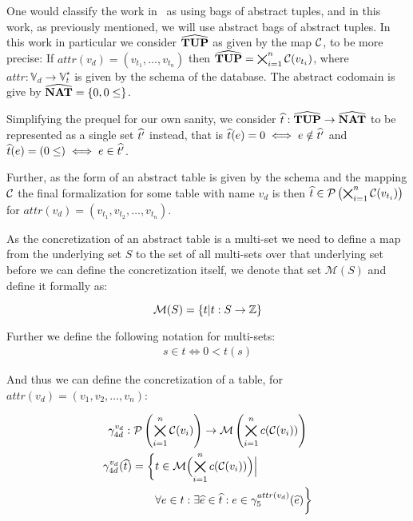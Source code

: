 One would classify the work in~\cite{halder_abstract_2012} as using bags of abstract tuples, and in this work, as previously mentioned, we will use abstract bags of abstract tuples.
In this work in particular we consider $\widehat{\mathbf{TUP}}$ as given by the map $\mathcal{C}$, to be more precise:
If $attr(v_d) = (v_{t_1}, \dots, v_{t_n})$ then $\widehat{\mathbf{TUP}} = \bigtimes_{i = 1}^n \mathcal{C}(v_{t_i})$, where $attr : \mathbb{V}_d \rightarrow \mathbb{V}_t^\star$ is given by the schema of the database.
The abstract codomain is give by $\widehat{\mathbf{NAT}} = \{0, 0 \leq\}$.

Simplifying the prequel for our own sanity, we consider $\widehat{t} : \widehat{\mathbf{TUP}} \rightarrow \widehat{\mathbf{NAT}}$ to be represented as a single set $\widehat{t'}$ instead, that is $\widehat{t}({e}) = 0 \iff e \notin \widehat{t'}$ and  $\widehat{t}({e}) = (0 \leq) \iff e \in \widehat{t'}$.

Further, as the form of an abstract table is given by the schema and the mapping $\mathcal{C}$ the final formalization for some table with name $v_d$ is then $\widehat{t} \in \mathcal{P}\left(\bigtimes_{i = 1}^{n}\mathcal{C}(v_{t_i})\right)$ for $attr(v_d) = (v_{t_1}, v_{t_2}, \dots, v_{t_n})$.

As the concretization of an abstract table is a multi-set we need to define a map from the underlying set $S$ to the set of all multi-sets over that underlying set before we can define the concretization itself, we denote that set $\mathcal{M}(S)$ and define it formally as:


\begin{equation}
    \mathcal{M}(S) = \{t | t : S \rightarrow \nums\}\label{eq:equation-nums}
\end{equation}

Further we define the following notation for multi-sets:
\begin{align}
    s \in t \iff 0 < t(s)
\end{align}

And thus we can define the concretization of a table, for $attr(v_d) = (v_1, v_2, \dots, v_n)$:


\begin{gather}
    \gamma^{v_d}_{4d} : \mathcal{P}\left(\bigtimes_{i = 1}^{n}\mathcal{C}(v_i)\right) \rightarrow \mathcal{M}\left(\bigtimes_{i = 1}^n c(\mathcal{C}(v_i))\right)\\
    \begin{split}
        \gamma^{v_d}_{4d}(\widehat{t}) = \biggl\{ &t \in \mathcal{M}\Bigl(\bigtimes_{i = 1}^n c(\mathcal{C}(v_i))\Bigr) \Big|\\
        &\forall e \in t : \exists \widehat{e} \in \widehat{t} : e \in \gamma^{attr(v_d)}_5(\widehat{e}) \biggr\}
    \end{split}
\end{gather}

